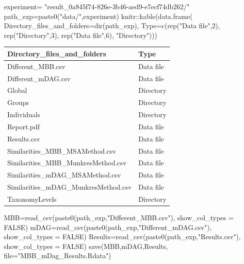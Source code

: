 \documentclass[
  letterpaper,
  DIV=11,
  numbers=noendperiod]{scrreprt}
\newenvironment{Shaded}{}{}
\newcommand{\AttributeTok}[1]{\textcolor[rgb]{0.78,0.47,0.87}{#1}}
\newcommand{\ConstantTok}[1]{\textcolor[rgb]{0.82,0.60,0.40}{#1}}
\newcommand{\DecValTok}[1]{\textcolor[rgb]{0.82,0.60,0.40}{#1}}
\newcommand{\FunctionTok}[1]{\textcolor[rgb]{0.38,0.69,0.94}{#1}}
\newcommand{\NormalTok}[1]{\textcolor[rgb]{0.67,0.70,0.75}{#1}}
\newcommand{\OtherTok}[1]{\textcolor[rgb]{0.15,0.68,0.38}{#1}}
\newcommand{\SpecialCharTok}[1]{\textcolor[rgb]{0.34,0.71,0.76}{#1}}
\newcommand{\StringTok}[1]{\textcolor[rgb]{0.60,0.76,0.47}{#1}}
\begin{document}
\begin{Shaded}
\begin{Highlighting}[]
\NormalTok{experiment}\OtherTok{=}
  \StringTok{"result\_0a845f74{-}826e{-}3b46{-}aed9{-}e7ecf74db262/"}
\NormalTok{path\_exp}\OtherTok{=}\FunctionTok{paste0}\NormalTok{(}\StringTok{"data/"}\NormalTok{,experiment)}
\NormalTok{knitr}\SpecialCharTok{::}\FunctionTok{kable}\NormalTok{(}\FunctionTok{data.frame}\NormalTok{(}
  \AttributeTok{Directory\_files\_and\_folders=}\FunctionTok{dir}\NormalTok{(path\_exp),}
  \AttributeTok{Type=}\FunctionTok{c}\NormalTok{(}\FunctionTok{rep}\NormalTok{(}\StringTok{"Data file"}\NormalTok{,}\DecValTok{2}\NormalTok{),}
  \FunctionTok{rep}\NormalTok{(}\StringTok{"Directory"}\NormalTok{,}\DecValTok{3}\NormalTok{),}
  \FunctionTok{rep}\NormalTok{(}\StringTok{"Data file"}\NormalTok{,}\DecValTok{6}\NormalTok{),}
  \StringTok{"Directory"}\NormalTok{)))}
\end{Highlighting}
\end{Shaded}

\begin{tabular}{l|l}
\hline
Directory\_files\_and\_folders & Type\\
\hline
Different\_MBB.csv & Data file\\
\hline
Different\_mDAG.csv & Data file\\
\hline
Global & Directory\\
\hline
Groups & Directory\\
\hline
Individuals & Directory\\
\hline
Report.pdf & Data file\\
\hline
Results.csv & Data file\\
\hline
Similarities\_MBB\_MSAMethod.csv & Data file\\
\hline
Similarities\_MBB\_MunkresMethod.csv & Data file\\
\hline
Similarities\_mDAG\_MSAMethod.csv & Data file\\
\hline
Similarities\_mDAG\_MunkresMethod.csv & Data file\\
\hline
TaxonomyLevels & Directory\\
\hline
\end{tabular}

\begin{Shaded}
\begin{Highlighting}[]
\NormalTok{MBB}\OtherTok{=}\FunctionTok{read\_csv}\NormalTok{(}\FunctionTok{paste0}\NormalTok{(path\_exp,}\StringTok{"Different\_MBB.csv"}\NormalTok{),}
             \AttributeTok{show\_col\_types =} \ConstantTok{FALSE}\NormalTok{)}
\NormalTok{mDAG}\OtherTok{=}\FunctionTok{read\_csv}\NormalTok{(}\FunctionTok{paste0}\NormalTok{(path\_exp,}\StringTok{"Different\_mDAG.csv"}\NormalTok{),}
              \AttributeTok{show\_col\_types =} \ConstantTok{FALSE}\NormalTok{)}
\NormalTok{Results}\OtherTok{=}\FunctionTok{read\_csv}\NormalTok{(}\FunctionTok{paste0}\NormalTok{(path\_exp,}\StringTok{"Results.csv"}\NormalTok{),}
                 \AttributeTok{show\_col\_types =} \ConstantTok{FALSE}\NormalTok{)}
\FunctionTok{save}\NormalTok{(MBB,mDAG,Results,}
     \AttributeTok{file=}\StringTok{"MBB\_mDag\_Results.Rdata"}\NormalTok{)}
\end{Highlighting}
\end{Shaded}
\end{document}
